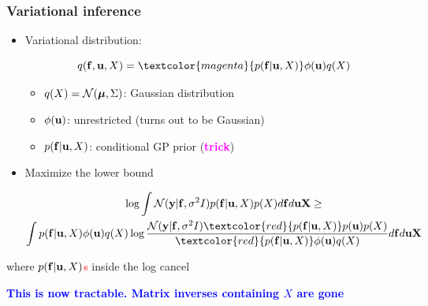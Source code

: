 \documentclass{beamer}
\begin{document}
\frame
{

\frametitle{Variational inference}


\begin{itemize}


\item Variational distribution: 

$$q(\bff, \bfu, X) = \textcolor{magenta}{p(\bff|\bfu, X)} \phi(\bfu) q(X)$$

\begin{itemize}




\item $q(X)=\mathcal{N}(\bm{\mu},\Sigma)$: Gaussian distribution

\item $\phi(\mathbf{u})$: unrestricted (turns out to be Gaussian) 

\item $p(\mathbf{f}|\mathbf{u}, X)$: conditional  GP prior (\textcolor{magenta}{\bf trick})


\end{itemize}


\item Maximize the lower bound

\begin{multline}
 \log \int \mathcal{N}(\bfy|\bff,\sigma^2 I) 
p(\bff|\bfu, X) p(X) d \bff d \bfu \bfX \geq \\
\int p(\bff|\bfu, X) \phi(\bfu) q(X)  
\log \frac{\mathcal{N}(\bfy|\bff,\sigma^2 I) 
\textcolor{red}{p(\bff|\bfu, X)} p(\bfu) p(X)}
{ \textcolor{red}{p(\bff|\bfu, X)} \phi(\bfu) q(X)} d \bff d \bfu \bfX
\nonumber 
\end{multline}

\end{itemize}

where \textcolor{red}{$p(\mathbf{f}|\mathbf{u}, X)$s} inside the log cancel

\textcolor{blue}{\bf This is now tractable. Matrix inverses containing $X$ are gone}


}
\end{document}

